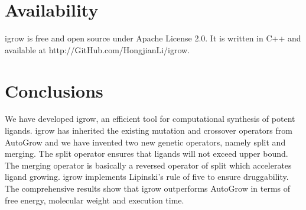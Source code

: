 \documentclass[10pt,conference,letterpaper]{IEEEtran}
\begin{document}
\section{Availability}
igrow is free and open source under Apache License 2.0. It is written in C++ and available at http://GitHub.com/HongjianLi/igrow.

\section{Conclusions}
We have developed igrow, an efficient tool for computational synthesis of potent ligands.
igrow has inherited the existing mutation and crossover operators from AutoGrow and we have invented two new genetic operators, namely split and merging.
The split operator ensures that ligands will not exceed upper bound.
The merging operator is basically a reversed operator of split which accelerates ligand growing.
igrow implements Lipinski's rule of five to ensure druggability.
The comprehensive results show that igrow outperforms AutoGrow in terms of free energy, molecular weight and execution time.



\end{document}
